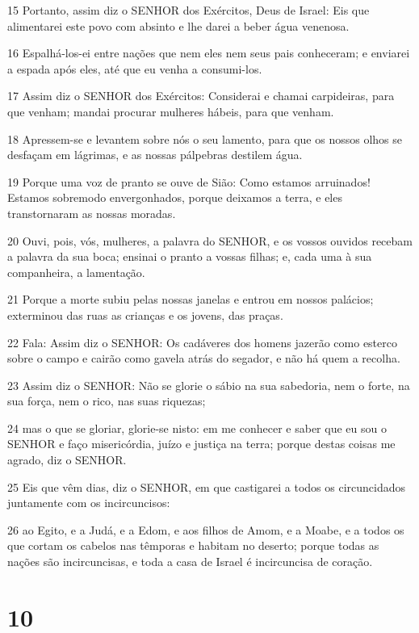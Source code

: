 \par 15 Portanto, assim diz o SENHOR dos Exércitos, Deus de Israel: Eis que alimentarei este povo com absinto e lhe darei a beber água venenosa.
\par 16 Espalhá-los-ei entre nações que nem eles nem seus pais conheceram; e enviarei a espada após eles, até que eu venha a consumi-los.
\par 17 Assim diz o SENHOR dos Exércitos: Considerai e chamai carpideiras, para que venham; mandai procurar mulheres hábeis, para que venham.
\par 18 Apressem-se e levantem sobre nós o seu lamento, para que os nossos olhos se desfaçam em lágrimas, e as nossas pálpebras destilem água.
\par 19 Porque uma voz de pranto se ouve de Sião: Como estamos arruinados! Estamos sobremodo envergonhados, porque deixamos a terra, e eles transtornaram as nossas moradas.
\par 20 Ouvi, pois, vós, mulheres, a palavra do SENHOR, e os vossos ouvidos recebam a palavra da sua boca; ensinai o pranto a vossas filhas; e, cada uma à sua companheira, a lamentação.
\par 21 Porque a morte subiu pelas nossas janelas e entrou em nossos palácios; exterminou das ruas as crianças e os jovens, das praças.
\par 22 Fala: Assim diz o SENHOR: Os cadáveres dos homens jazerão como esterco sobre o campo e cairão como gavela atrás do segador, e não há quem a recolha.
\par 23 Assim diz o SENHOR: Não se glorie o sábio na sua sabedoria, nem o forte, na sua força, nem o rico, nas suas riquezas;
\par 24 mas o que se gloriar, glorie-se nisto: em me conhecer e saber que eu sou o SENHOR e faço misericórdia, juízo e justiça na terra; porque destas coisas me agrado, diz o SENHOR.
\par 25 Eis que vêm dias, diz o SENHOR, em que castigarei a todos os circuncidados juntamente com os incircuncisos:
\par 26 ao Egito, e a Judá, e a Edom, e aos filhos de Amom, e a Moabe, e a todos os que cortam os cabelos nas têmporas e habitam no deserto; porque todas as nações são incircuncisas, e toda a casa de Israel é incircuncisa de coração.

\chapter{10}

